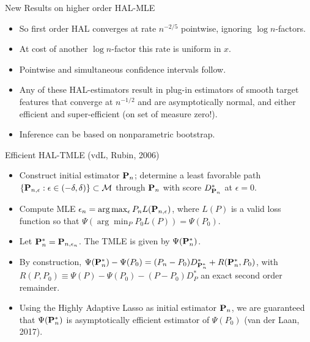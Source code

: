 \documentclass[t]{beamer}
\begin{document}
\begin{frame}{New Results on higher order HAL-MLE}
\begin{itemize}
\item So first order HAL converges at rate $n^{-2/5}$ pointwise, ignoring $\log n$-factors.
\item At cost of another $\log n$-factor this rate is uniform in $x$.
\item Pointwise and simultaneous  confidence intervals follow.
\item Any of these HAL-estimators result in plug-in estimators of smooth target features that converge at $n^{-1/2}$ and are asymptotically normal, and either efficient and super-efficient (on set of measure zero!).
\item Inference can be based on nonparametric bootstrap.
\end{itemize}
\end{frame}

\begin{frame}{Efficient HAL-TMLE (vdL, Rubin, 2006)}
\begin{itemize}
\item Construct initial estimator ${\bf P}_n$; determine a least favorable path $\{{\bf P}_{n,\epsilon}:\epsilon\in (-\delta,\delta)\}\subset {\cal M}$ through ${\bf P}_n$ with score $D^*_{{\bf P}_n}$ at $\epsilon =0$.
\item Compute MLE $\epsilon_n =\arg\max_{\epsilon}P_n L({\bf P}_{n,\epsilon})$, where $L(P)$ is a valid loss function so that $\Psi(\arg\min_P P_0L(P))=\Psi(P_0)$.
\item Let ${\bf P}_n^*={\bf P}_{n,\epsilon_n}$. The TMLE is given by $\Psi({\bf P}_n^*)$.
\item By construction, $\Psi({\bf P}_n^*)-\Psi(P_0)=(P_n-P_0)D^*_{{\bf P}_n^*}+R({\bf P}_n^*,P_0)$, with $R(P,P_0)\equiv \Psi(P)-\Psi(P_0)-(P-P_0)D^*_P$ an exact second order remainder.
\item Using the Highly Adaptive Lasso as initial estimator ${\bf P}_n$, we are guaranteed that $\Psi({\bf P}_n^*)$ is asymptotically efficient estimator of $\Psi(P_0)$ (van der Laan, 2017).
\end{itemize}
\end{frame}
\end{document}
